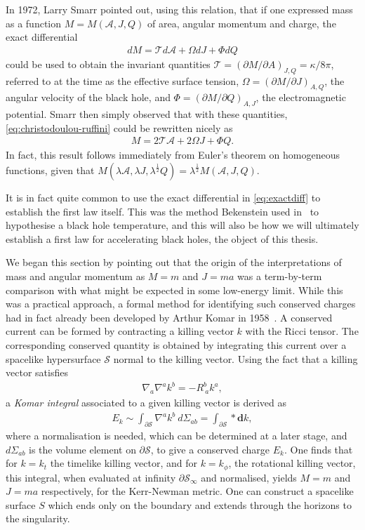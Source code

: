 \documentclass[
twoside,
openright,
frontopenright,
]{dmathesis}
\begin{document}
In 1972, Larry Smarr pointed out, using this relation, that if one expressed
mass as a function $M=M(\mathcal{A},J,Q)$ of area, angular momentum and charge,
the exact differential
\begin{align}
  \label{eq:exactdiff}
dM = \mathcal{T}d\mathcal{A} + \Omega dJ + \Phi dQ
\end{align}
could be used to obtain the invariant quantities
$\mathcal{T} = (\partial M/\partial A)_{J,Q} = \kappa/8\pi$, referred to at the
time as the effective surface tension, $\Omega=(\partial M/\partial J)_{A,Q}$,
the angular velocity of the black hole, and
$\Phi = (\partial M/\partial Q)_{A,J}$, the electromagnetic potential. Smarr
then simply observed that with these quantities, \cref{eq:christodoulou-ruffini}
could be rewritten nicely as
\begin{align}
  \label{eq:smarrrelation}
  M = 2\mathcal{T}\mathcal{A} + 2\Omega J + \Phi Q.
\end{align}
In fact, this result follows immediately from Euler's theorem on homogeneous
functions, given that $M(\lambda\mathcal{A}, \lambda J, \lambda^\frac12 Q) =
\lambda^\frac12 M(\mathcal{A},J,Q)$.

It is in fact quite common to use the exact differential in \cref{eq:exactdiff}
to establish the first law itself. This was the method Bekenstein used
in~\cite{Bekenstein:1973ur} to hypothesise a black hole temperature, and this
will also be how we will ultimately establish a first law for accelerating black
holes, the object of this thesis. 

We began this section by pointing out that the origin of the interpretations of
mass and angular momentum as $M = m$ and $J = ma$ was a term-by-term comparison
with what might be expected in some low-energy limit. While this was a practical
approach, a formal method for identifying such conserved charges had in fact
already been developed by Arthur Komar in 1958~\cite{Komar:1959aa}. A conserved
current can be formed by contracting a killing vector $k$ with the Ricci
tensor. The corresponding conserved quantity is obtained by integrating this
current over a spacelike hypersurface $\mathcal{S}$ normal to the killing
vector. Using the fact that a killing vector satisfies
\begin{align}
  \label{eq:killing}
  \nabla_a \nabla^a k^b = -R^b_{~a}k^a,
\end{align}
a \emph{Komar integral} associated to a given killing vector is derived
as
\begin{align}
  \label{eq:komar}
  E_k\sim\int_{\partial\mathcal{S}} \nabla^a k^b ~ d\Sigma_{ab} = \int_{\partial\mathcal{S}} * \mathrm{\mathbf{d}}k,
\end{align}
where a normalisation is needed, which can be determined at a later stage, and
$d\Sigma_{ab}$ is the volume element on $\partial \mathcal{S}$, to give a
conserved charge $E_k$. One finds that for $k = k_t$ the timelike killing
vector, and for $k = k_\phi$, the rotational killing vector, this integral, when
evaluated at infinity $\partial \mathcal{S}_\infty$ and normalised, yields
$M = m$ and $J = m a$ respectively, for the Kerr-Newman metric. One can
construct a spacelike surface $S$ which ends only on the boundary and extends
through the horizons to the singularity.
\end{document}
